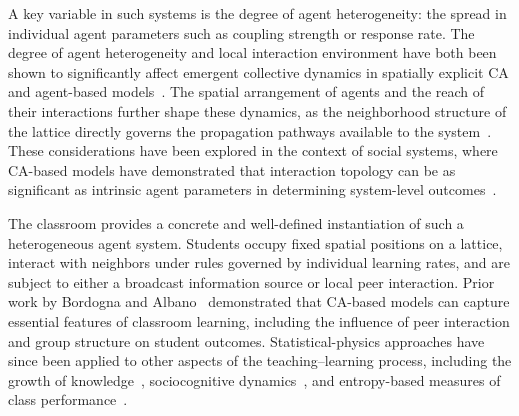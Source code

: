 \documentclass[a4paper,fleqn]{cas-sc}
\begin{document}
A key variable in such systems is the degree of agent heterogeneity: the spread in individual agent parameters such as coupling strength or response rate.
The degree of agent heterogeneity and local interaction environment have both been shown to significantly affect emergent collective dynamics in spatially explicit CA and agent-based models~\citep{lopez2014addressing, brown2006effects, jiao2011emergent}.
The spatial arrangement of agents and the reach of their interactions further shape these dynamics, as the neighborhood structure of the lattice directly governs the propagation pathways available to the system~\citep{dong2021influence, kari2005catheory}.
These considerations have been explored in the context of social systems, where CA-based models have demonstrated that interaction topology can be as significant as intrinsic agent parameters in determining system-level outcomes~\citep{bordogna2001theoretical, bordogna2003simulation, castellano2009statistical}.

The classroom provides a concrete and well-defined instantiation of such a heterogeneous agent system.
Students occupy fixed spatial positions on a lattice, interact with neighbors under rules governed by individual learning rates, and are subject to either a broadcast information source or local peer interaction.
Prior work by Bordogna and Albano~\citep{bordogna2001theoretical, bordogna2003simulation} demonstrated that CA-based models can capture essential features of classroom learning, including the influence of peer interaction and group structure on student outcomes.
Statistical-physics approaches have since been applied to other aspects of the teaching--learning process, including the growth of knowledge~\citep{ormazabal2021agent, velasquez2021knowledge}, sociocognitive dynamics~\citep{koponen2017modelling}, and entropy-based measures of class performance~\citep{singh2009entropic}.
\end{document}
